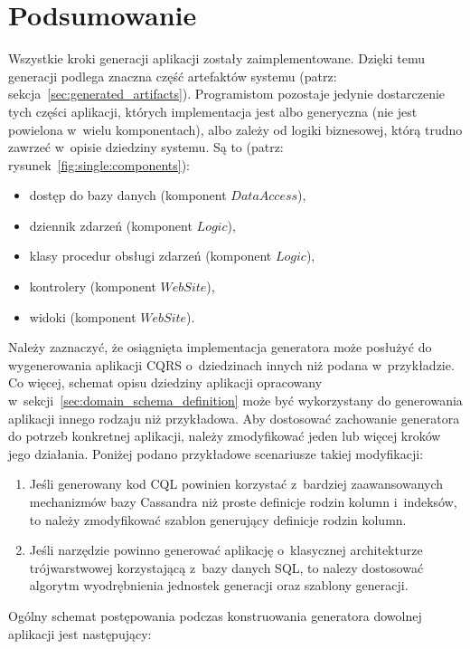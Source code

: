 \section{Podsumowanie} \label{sec:impl:summary}

Wszystkie kroki generacji aplikacji zostały zaimplementowane.
Dzięki temu generacji podlega znaczna część artefaktów systemu (patrz: sekcja~\ref{sec:generated_artifacts}).
Programistom pozostaje jedynie dostarczenie tych części aplikacji, których implementacja jest albo generyczna (nie jest powielona w~wielu komponentach), albo zależy od logiki biznesowej, którą trudno zawrzeć w~opisie dziedziny systemu.
Są to (patrz: rysunek~\ref{fig:single:components}):

\begin{itemize}
 \item dostęp do bazy danych (komponent $DataAccess$),
 \item dziennik zdarzeń (komponent $Logic$),
 \item klasy procedur obsługi zdarzeń (komponent $Logic$),
 \item kontrolery (komponent $WebSite$),
 \item widoki (komponent $WebSite$).
\end{itemize}

Należy zaznaczyć, że osiągnięta implementacja generatora może posłużyć do wygenerowania aplikacji CQRS o~dziedzinach innych niż podana w~przykładzie.
Co więcej, schemat opisu dziedziny aplikacji opracowany w~sekcji~\ref{sec:domain_schema_definition} może być wykorzystany do generowania aplikacji innego rodzaju niż przykładowa.
Aby dostosować zachowanie generatora do potrzeb konkretnej aplikacji, należy zmodyfikować jeden lub więcej kroków jego działania.
Poniżej podano przykładowe scenariusze takiej modyfikacji:

\begin{enumerate}
 \item Jeśli generowany kod CQL powinien korzystać z~bardziej zaawansowanych mechanizmów bazy Cassandra niż proste definicje rodzin kolumn i~indeksów, to należy zmodyfikować szablon generujący definicje rodzin kolumn.
 \item Jeśli narzędzie powinno generować aplikację o~klasycznej architekturze trójwarstwowej korzystającą z~bazy danych SQL, to nalezy dostosować algorytm wyodrębnienia jednostek generacji oraz szablony generacji.
\end{enumerate}

Ogólny schemat postępowania podczas konstruowania generatora dowolnej aplikacji jest następujący:

